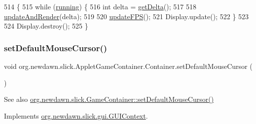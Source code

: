 \begin{DoxyCode}
514                                              \{
515          \textcolor{keywordflow}{while} (\mbox{\hyperlink{classorg_1_1newdawn_1_1slick_1_1_game_container_a5cb10a093281abb5b6ee60f2b18c26c3}{running}}) \{
516             \textcolor{keywordtype}{int} delta = \mbox{\hyperlink{classorg_1_1newdawn_1_1slick_1_1_game_container_a47af7100d91a7101cb71574dc70fb0dc}{getDelta}}();
517 
518             \mbox{\hyperlink{classorg_1_1newdawn_1_1slick_1_1_game_container_a91b4f51ca42ad0b9dcca0e9fc2118f9f}{updateAndRender}}(delta);
519 
520             \mbox{\hyperlink{classorg_1_1newdawn_1_1slick_1_1_game_container_a3894fc3250d4731e4218bc69bfc281df}{updateFPS}}();
521             Display.update();
522          \}
523 
524          Display.destroy();
525       \}
\end{DoxyCode}
\mbox{\label{classorg_1_1newdawn_1_1slick_1_1_applet_game_container_1_1_container_a563df6ad2a0918faa30545da4ed48cb0}} 
\subsubsection{\texorpdfstring{set\+Default\+Mouse\+Cursor()}{setDefaultMouseCursor()}}
{\footnotesize\ttfamily void org.\+newdawn.\+slick.\+Applet\+Game\+Container.\+Container.\+set\+Default\+Mouse\+Cursor (\begin{DoxyParamCaption}{ }\end{DoxyParamCaption})\hspace{0.3cm}{\ttfamily [inline]}}

\begin{DoxySeeAlso}{See also}
\mbox{\hyperlink{classorg_1_1newdawn_1_1slick_1_1_game_container_aafbac3cb7c8bb30af0bcafa4b86e33a0}{org.\+newdawn.\+slick.\+Game\+Container\+::set\+Default\+Mouse\+Cursor()}} 
\end{DoxySeeAlso}


Implements \mbox{\hyperlink{interfaceorg_1_1newdawn_1_1slick_1_1gui_1_1_g_u_i_context_a665c6e15e417418eccf462a1ec957b1a}{org.\+newdawn.\+slick.\+gui.\+G\+U\+I\+Context}}.


